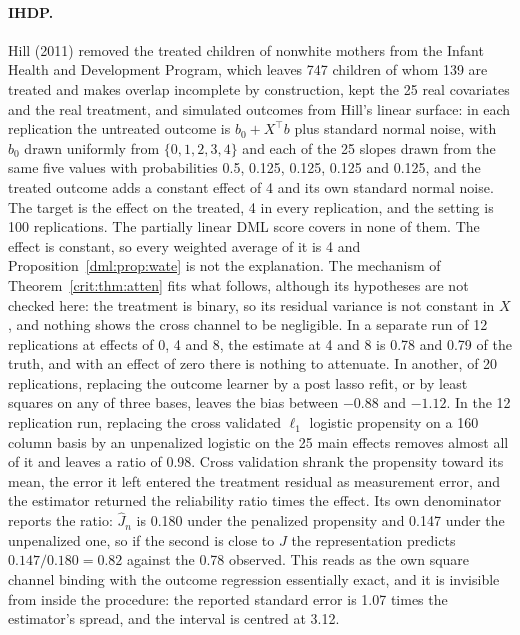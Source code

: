\paragraph{IHDP.} Hill (2011) removed the treated children of nonwhite mothers from the Infant Health and Development Program, which leaves 747 children of whom 139 are treated and makes overlap incomplete by construction, kept the 25 real covariates and the real treatment, and simulated outcomes from Hill's linear surface: in each replication the untreated outcome is $b_0 + X^\top b$ plus standard normal noise, with $b_0$ drawn uniformly from $\{0, 1, 2, 3, 4\}$ and each of the 25 slopes drawn from the same five values with probabilities 0.5, 0.125, 0.125, 0.125 and 0.125, and the treated outcome adds a constant effect of 4 and its own standard normal noise. The target is the effect on the treated, 4 in every replication, and the setting is 100 replications. The partially linear DML score covers in none of them. The effect is constant, so every weighted average of it is 4 and Proposition~\ref{dml:prop:wate} is not the explanation. The mechanism of Theorem~\ref{crit:thm:atten} fits what follows, although its hypotheses are not checked here: the treatment is binary, so its residual variance is not constant in $X$, and nothing shows the cross channel to be negligible. In a separate run of 12 replications at effects of 0, 4 and 8, the estimate at 4 and 8 is 0.78 and 0.79 of the truth, and with an effect of zero there is nothing to attenuate. In another, of 20 replications, replacing the outcome learner by a post lasso refit, or by least squares on any of three bases, leaves the bias between $-0.88$ and $-1.12$. In the 12 replication run, replacing the cross validated $\ell_1$ logistic propensity on a 160 column basis by an unpenalized logistic on the 25 main effects removes almost all of it and leaves a ratio of 0.98. Cross validation shrank the propensity toward its mean, the error it left entered the treatment residual as measurement error, and the estimator returned the reliability ratio times the effect. Its own denominator reports the ratio: $\hat J_n$ is 0.180 under the penalized propensity and 0.147 under the unpenalized one, so if the second is close to $J$ the representation predicts $0.147/0.180 = 0.82$ against the 0.78 observed. This reads as the own square channel binding with the outcome regression essentially exact, and it is invisible from inside the procedure: the reported standard error is 1.07 times the estimator's spread, and the interval is centred at 3.12.

